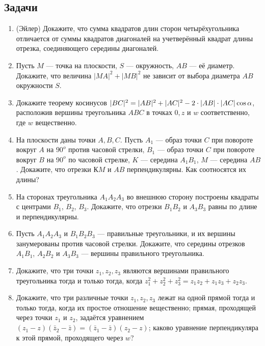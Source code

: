 \subsection*{Задачи}

\begin{enumerate}
\item (Эйлер) Докажите, что сумма квадратов длин сторон четырёхугольника отличается от суммы 
квадратов диагоналей на учетверённый квадрат длины отрезка, соединяющего середины диагоналей.
\item Пусть $M$ --- точка на плоскости, $S$ --- окружность, $AB$ --- её диаметр. Докажите, что величина
$|MA|^2 + |MB|^2$ не зависит от выбора диаметра $AB$ окружности $S$.
\item Докажите теорему косинусов $|BC|^2 = |AB|^2 +|AC|^2 -2\cdot |AB|\cdot |AC|\cos\alpha$, расположив вершины треугольника $ABC$ в точках $0, z$ и $w$ соответственно, где $w$ вещественно.
\item На плоскости даны точки $A, B, C$. Пусть $A_1$ --- образ точки $C$ при повороте вокруг $A$ на $90^o$ против
часовой стрелки, $B_1$ --- образ точки $C$ при повороте вокруг $B$ на $90^o$ по часовой стрелке, $K$ --- середина $A_1B_1$, $M$ --- середина $AB$. Докажите, что отрезки $КM$ и $AB$ перпендикулярны. Как соотносятся их длины?
\item На сторонах треугольника $A_1A_2A_3$ во внешнюю сторону построены квадраты с центрами $B_1$, $B_2$, $B_3$.
Докажите, что отрезки $B_1B_2$ и $A_3B_3$ равны по длине и перпендикулярны.
\item Пусть $A_1A_2A_3$ и $B_1B_2B_3$ --- правильные треугольники, и их вершины занумерованы против часовой
стрелки. Докажите, что середины отрезков $A_1B_1$, $A_2B_2$ и $A_3B_3$ --- вершины правильного треугольника.
\item Докажите, что три точки $z_1, z_2, z_3$ являются вершинами правильного треугольника тогда и только
тогда, когда $z_1^2 + z_2^2 + z_3^2 = z_1 z_2 + z_1 z_3 + z_2z_3$.
\item Докажите, что \ipunkt три различные точки $z_1, z_2, z_3$ лежат на одной прямой тогда и только тогда,
когда их простое отношение вещественно; \ipunkt прямая, проходящей через точки $z_1$ и $z_2$, задаётся уравнением
$(z_1 - z)(\bar z_2 - \bar z) = (\bar z_1 - \bar z)(z_2 - z)$; \ipunkt каково уравнение перпендикуляра к этой прямой, проходящего через $w$?


\end{enumerate}
